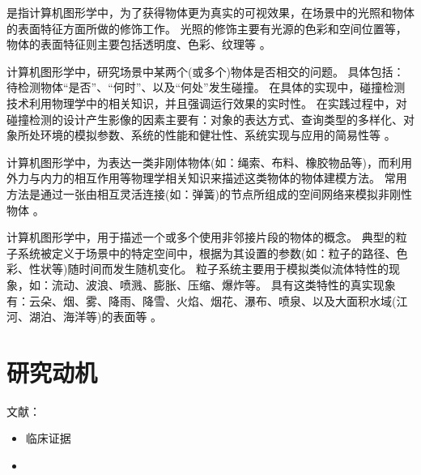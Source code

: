 \begin{definition}[渲染]
是指计算机图形学中，为了获得物体更为真实的可视效果，在场景中的光照和物体的表面特征方面所做的修饰工作。
光照的修饰主要有光源的色彩和空间位置等，物体的表面特征则主要包括透明度、色彩、纹理等 \cite{Hearn2004CGBook}。
\end{definition}

\begin{definition}[碰撞检测]
计算机图形学中，研究场景中某两个(或多个)物体是否相交的问题。
具体包括：待检测物体“是否”、“何时”、以及“何处”发生碰撞。
在具体的实现中，碰撞检测技术利用物理学中的相关知识，并且强调运行效果的实时性。
在实践过程中，对碰撞检测的设计产生影像的因素主要有：对象的表达方式、查询类型的多样化、对象所处环境的模拟参数、系统的性能和健壮性、系统实现与应用的简易性等 \cite{Ericson2005CDBook}。%
\end{definition}

\begin{definition}[形变模型]
计算机图形学中，为表达一类非刚体物体(如：绳索、布料、橡胶物品等)，而利用外力与内力的相互作用等物理学相关知识来描述这类物体的物体建模方法。
常用方法是通过一张由相互灵活连接(如：弹簧)的节点所组成的空间网络来模拟非刚性物体 \cite{Hearn2004CGBook}。
\end{definition}

\begin{definition}[中心线提取]
\end{definition}

\begin{definition}[状态机]
\end{definition}

\begin{definition}[粒子系统]
计算机图形学中，用于描述一个或多个使用非邻接片段的物体的概念。
典型的粒子系统被定义于场景中的特定空间中，根据为其设置的参数(如：粒子的路径、色彩、性状等)随时间而发生随机变化。
粒子系统主要用于模拟类似流体特性的现象，如：流动、波浪、喷溅、膨胀、压缩、爆炸等。
具有这类特性的真实现象有：云朵、烟、雾、降雨、降雪、火焰、烟花、瀑布、喷泉、以及大面积水域(江河、湖泊、海洋等)的表面等 \cite{Hearn2004CGBook}。
\end{definition}

\section{研究动机}
\label{sec1-2}

文献：
\begin{itemize}
  \item 临床证据\cite{Aggarwal2006}
  \item
\end{itemize}

